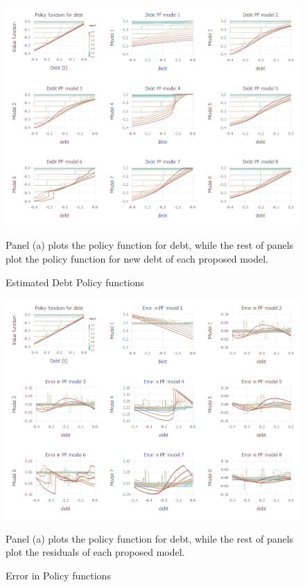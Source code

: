 \documentclass[12pt, a4paper]{article}
\begin{document}
\begin{figure}[!hbt]
	\centering
	\caption{Estimated Debt Policy functions}
	\includegraphics[scale=0.5]{../Plots/PFB.png}
	\begin{minipage}{0.85\textwidth}
		{\scriptsize Panel (a)  plots the policy function for debt, while the rest of panels plot the policy function for new debt of each proposed model.\par}
	\end{minipage}
\end{figure}

\begin{figure}[!hbt]
	\centering
	\caption{Error in Policy functions}
	\includegraphics[scale=0.5]{../Plots/PFBerror.png}
	\begin{minipage}{0.85\textwidth}
		{\scriptsize Panel (a)  plots the policy function for debt, while the rest of panels plot the residuals of each proposed model.\par}
	\end{minipage}
	\label{fig:erroPF}
\end{figure}
\end{document}
